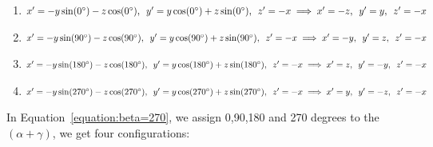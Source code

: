 \begin{enumerate}
  \item  $x'=-y\sin(0^{\circ})-z\cos(0^{\circ}),\hspace{5pt} y'=y\cos(0^{\circ})+z\sin(0^{\circ}),\hspace{5pt} z'=-x \\\implies x'=-z,\hspace{5pt} y'=y,\hspace{5pt} z'=-x$
  \item  $x'=-y\sin(90^{\circ})-z\cos(90^{\circ}), \hspace{5pt} y'=y\cos(90^{\circ})+z\sin(90^{\circ}), \hspace{5pt} z'=-x\\\implies x'=-y,\hspace{5pt} y'=z,\hspace{5pt} z'=-x$
  \item  $x'=-y\sin(180^{\circ})-z\cos(180^{\circ}), \hspace{5pt} y'=y\cos(180^{\circ})+z\sin(180^{\circ}), \hspace{5pt} z'=-x\\\implies x'=z,\hspace{5pt} y'=-y,\hspace{5pt} z'=-x$
  \item  $x'=-y\sin(270^{\circ})-z\cos(270^{\circ}), \hspace{5pt} y'=y\cos(270^{\circ})+z\sin(270^{\circ}), \hspace{5pt} z'=-x\\\implies x'=y, \hspace{5pt}y'=-z,\hspace{5pt} z'=-x$
  \label{3Drotation24situations1}
\end{enumerate}
In Equation~\ref{equation:beta=270}, we assign 0,90,180 and 270 degrees to the $(\alpha+\gamma)$, we get four configurations:
